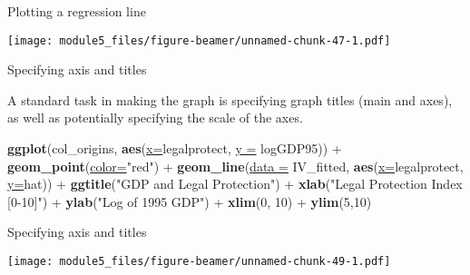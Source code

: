 \documentclass[ignorenonframetext,]{beamer}
\newenvironment{Shaded}{\begin{snugshade}}{\end{snugshade}}
\newcommand{\KeywordTok}[1]{\textcolor[rgb]{0.26,0.66,0.93}{\textbf{#1}}}
\newcommand{\DataTypeTok}[1]{\textcolor[rgb]{0.74,0.68,0.62}{\underline{#1}}}
\newcommand{\DecValTok}[1]{\textcolor[rgb]{0.27,0.67,0.26}{#1}}
\newcommand{\StringTok}[1]{\textcolor[rgb]{0.02,0.61,0.04}{#1}}
\newcommand{\OperatorTok}[1]{\textcolor[rgb]{0.74,0.68,0.62}{#1}}
\newcommand{\NormalTok}[1]{\textcolor[rgb]{0.74,0.68,0.62}{#1}}
\begin{document}
\begin{frame}{Plotting a regression line}

\texttt{[image: module5\_files/figure-beamer/unnamed-chunk-47-1.pdf]}

\end{frame}

\begin{frame}[fragile]{Specifying axis and titles}

A standard task in making the graph is specifying graph titles (main and
axes), as well as potentially specifying the scale of the axes.

\begin{Shaded}
\begin{Highlighting}[]
\KeywordTok{ggplot}\NormalTok{(col_origins, }
  \KeywordTok{aes}\NormalTok{(}\DataTypeTok{x=}\NormalTok{legalprotect, }\DataTypeTok{y =}\NormalTok{ logGDP95))  }\OperatorTok{+}\StringTok{ }
\StringTok{  }\KeywordTok{geom_point}\NormalTok{(}\DataTypeTok{color=}\StringTok{"red"}\NormalTok{) }\OperatorTok{+}\StringTok{  }
\StringTok{  }\KeywordTok{geom_line}\NormalTok{(}\DataTypeTok{data =}\NormalTok{ IV_fitted, }
  \KeywordTok{aes}\NormalTok{(}\DataTypeTok{x=}\NormalTok{legalprotect, }\DataTypeTok{y=}\NormalTok{hat))  }\OperatorTok{+}\StringTok{ }
\StringTok{  }\KeywordTok{ggtitle}\NormalTok{(}\StringTok{"GDP and Legal Protection"}\NormalTok{) }\OperatorTok{+}
\StringTok{  }\KeywordTok{xlab}\NormalTok{(}\StringTok{"Legal Protection Index [0-10]"}\NormalTok{) }\OperatorTok{+}\StringTok{ }
\StringTok{  }\KeywordTok{ylab}\NormalTok{(}\StringTok{"Log of 1995 GDP"}\NormalTok{) }\OperatorTok{+}
\StringTok{  }\KeywordTok{xlim}\NormalTok{(}\DecValTok{0}\NormalTok{, }\DecValTok{10}\NormalTok{) }\OperatorTok{+}\StringTok{ }\KeywordTok{ylim}\NormalTok{(}\DecValTok{5}\NormalTok{,}\DecValTok{10}\NormalTok{)}
\end{Highlighting}
\end{Shaded}

\end{frame}

\begin{frame}{Specifying axis and titles}

\texttt{[image: module5\_files/figure-beamer/unnamed-chunk-49-1.pdf]}

\end{frame}
\end{document}

